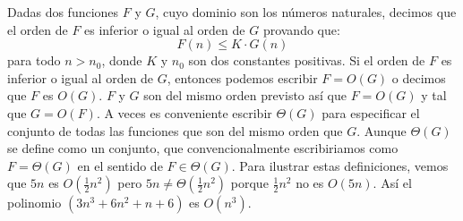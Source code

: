 \documentclass[10pt,a5paper]{book}
\begin{document}
Dadas dos funciones $F$ y $G$, cuyo dominio son los números naturales, decimos que el orden de $F$ es inferior o igual al orden de $G$ provando que: \[ F(n) \le  K\cdot G(n) \]
para todo $n > n_0$, donde $K$ y $n_0$ son dos constantes positivas. Si el orden de $F$ es inferior o igual al orden de $G$, entonces podemos escribir $F = O(G)$ o decimos que $F$ es $O(G)$. $F$ y $G$ son del mismo orden previsto así que $F = O(G)$ y tal que $G = O(F)$. A veces es conveniente escribir $\Theta(G)$ para especificar el conjunto de todas las funciones que son del mismo orden que $G$. Aunque $\Theta(G)$ se define como un conjunto, que convencionalmente escribiriamos como $F = \Theta(G)$ en el sentido de $F \in \Theta(G)$. Para ilustrar estas definiciones, vemos que $5n$ es $O(\frac{1}{2}n^2)$ pero $5n \ne \Theta(\frac{1}{2}n^2)$ porque $\frac{1}{2}n^2$ no es $O(5n)$. Así el polinomio $(3n^3 + 6n^2 + n + 6)$ es $O(n^3)$.
\end{document}
